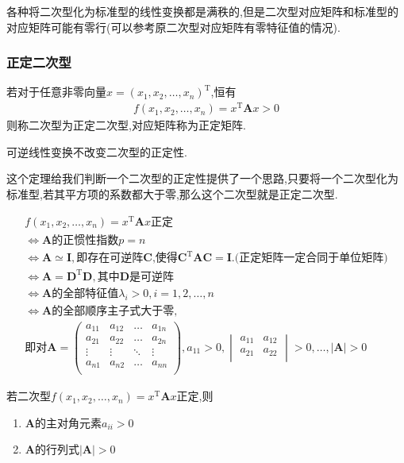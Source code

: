 各种将二次型化为标准型的线性变换都是满秩的,但是二次型对应矩阵和标准型的对应矩阵可能有零行(可以参考原二次型对应矩阵有零特征值的情况).

\subsubsection{正定二次型}
\begin{definition}
    若对于任意非零向量$x=(x_1,x_2,\dots,x_n)^\mathrm{T}$,恒有
    \begin{gather*}
        f(x_1,x_2,\dots,x_n)=x^\mathrm{T}\mathbf{A}x>0
    \end{gather*}
    则称二次型为正定二次型,对应矩阵称为正定矩阵.
\end{definition}

\begin{ttheorem}
    可逆线性变换不改变二次型的正定性.
\end{ttheorem}

这个定理给我们判断一个二次型的正定性提供了一个思路,只要将一个二次型化为标准型,若其平方项的系数都大于零,那么这个二次型就是正定二次型.

\begin{ttheorem}[（$f$正定的充要条件）]
    \begin{gather*}
        f(x_1,x_2,\dots,x_n)=x^\mathrm{T}\mathbf{A}x\text{正定}\\
        \iff \mathbf{A} \text{的正惯性指数}p=n\\
        \iff \mathbf{A}\simeq \mathbf{I}, \text{即存在可逆阵$\mathbf{C}$,使得}\mathbf{C}^\mathrm{T}\mathbf{A}\mathbf{C}=\mathbf{I}.\text{(正定矩阵一定合同于单位矩阵)}\\
        \iff \mathbf{A}=\mathbf{D}^\mathrm{T}\mathbf{D},\text{其中$\mathbf{D}$是可逆阵}\\
        \iff \mathbf{A}\text{的全部特征值}\lambda_i>0,i=1,2,\dots,n\\
        \iff \mathbf{A}\text{的全部顺序主子式大于零},\\
        \text{即对}\mathbf{A}=
        \begin{pmatrix}
            a_{11}   &   a_{12}   &   \dots   &   a_{1n}   \\
            a_{21}   &   a_{22}   &   \dots   &   a_{2n}   \\
            \vdots   &   \vdots   &   \ddots   &   \vdots   \\
            a_{n1}   &   a_{n2}   &   \dots   &   a_{nn}   \\
        \end{pmatrix}
        ,a_{11}>0,\begin{vmatrix}
        a_{11}   &   a_{12}   \\
        a_{21}   &   a_{22}   \\
        \end{vmatrix}
        >0,\dots,
        \left\lvert \mathbf{A}\right\rvert >0
    \end{gather*}
\end{ttheorem}

若二次型$f(x_1,x_2,\dots,x_n)=x^\mathrm{T}\mathbf{A}x$正定,则
\begin{enumerate}
    \item $\mathbf{A}$的主对角元素$a_{ii}>0$
    \item $\mathbf{A}$的行列式$\left\lvert \mathbf{A}\right\rvert >0$
\end{enumerate}



